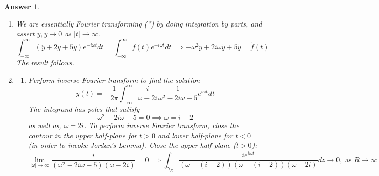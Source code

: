 \documentclass[a4paper]{article}
\newtheorem{ans}{Answer}[section]
\theoremstyle{new}
\begin{document}
\begin{ans}\leavevmode
\begin{enumerate}[label=(\alph*)]
\item We are essentially Fourier transforming (*) by doing integration by parts, and assert $y,\dot{y}\rightarrow 0$ as $|t|\rightarrow\infty$.
$$\int_{-\infty}^\infty(\ddot{y}+2\dot{y}+5y)e^{-i\omega t}dt=\int_{-\infty}^\infty f(t)e^{-i\omega t}dt\implies-\omega^2\tilde{y}+2i\omega\tilde{y}+5\tilde{y}=\tilde{f}(t)$$
The result follows.
\item 
\begin{enumerate}[label=(\roman*)]
\item Perform inverse Fourier transform to find the solution
$$y(t)=-\frac{1}{2\pi}\int_{-\infty}^\infty\frac{i}{\omega -2i}\frac{1}{\omega^2-2i\omega-5}e^{i\omega t}dt$$
The integrand has poles that satisfy $$\omega^2-2i\omega-5=0\implies\omega=i\pm 2$$
as well as, $\omega=2i$. To perform inverse Fourier transform, close the contour in the upper half-plane for $t>0$ and lower half-plane for $t<0$ (in order to invoke Jordan's Lemma). Close the upper half-plane ($t>0$):
$$\lim_{|\omega|\rightarrow\infty}\frac{i}{(\omega^2-2i\omega-5)(\omega-2i)}=0\implies\int_{\gamma_R}\frac{ie^{i\omega t}}{(\omega-(i+2))(\omega-(i-2))(\omega-2i)}dz\rightarrow 0,\text{ as }R\rightarrow\infty$$
\begin{center}
\end{center}
\end{enumerate}
\end{enumerate}
\end{ans}
\end{document}
